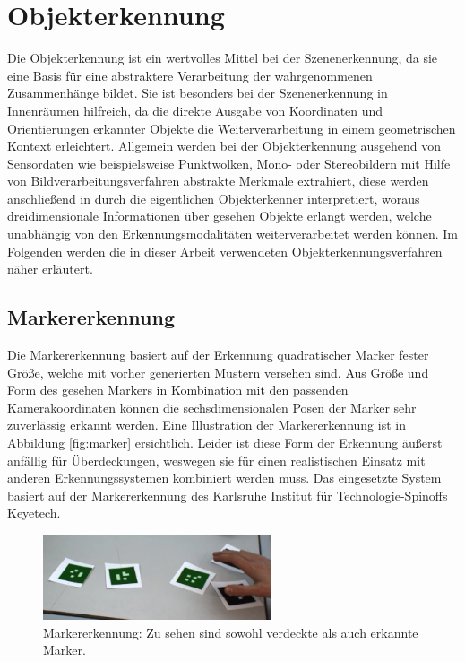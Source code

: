 \section{Objekterkennung}

Die Objekterkennung ist ein wertvolles Mittel bei der Szenenerkennung, da sie eine Basis für eine abstraktere Verarbeitung der wahrgenommenen Zusammenhänge bildet.
Sie ist besonders bei der Szenenerkennung in Innenräumen hilfreich, da die direkte Ausgabe von Koordinaten und Orientierungen erkannter Objekte die Weiterverarbeitung in einem geometrischen Kontext erleichtert.
Allgemein werden bei der Objekterkennung ausgehend von Sensordaten wie beispielsweise Punktwolken, Mono- oder Stereobildern mit Hilfe von Bildverarbeitungsverfahren abstrakte Merkmale extrahiert, diese werden anschließend in durch die eigentlichen Objekterkenner interpretiert, woraus dreidimensionale Informationen über gesehen Objekte erlangt werden, welche unabhängig von den Erkennungsmodalitäten weiterverarbeitet werden können.
Im Folgenden werden die in dieser Arbeit verwendeten Objekterkennungsverfahren näher erläutert.

\subsection{Markererkennung}

Die Markererkennung basiert auf der Erkennung quadratischer Marker fester Größe, welche mit vorher generierten Mustern versehen sind.
Aus Größe und Form des gesehen Markers in Kombination mit den passenden Kamerakoordinaten können die sechsdimensionalen Posen der Marker sehr zuverlässig erkannt werden.
Eine Illustration der Markererkennung ist in Abbildung \vref{fig:marker} ersichtlich.
Leider ist diese Form der Erkennung äußerst anfällig für Überdeckungen, weswegen sie für einen realistischen Einsatz mit anderen Erkennungssystemen kombiniert werden muss.
Das eingesetzte System basiert auf der Markererkennung des Karlsruhe Institut für Technologie-Spinoffs Keyetech.

\begin{figure}
  \centering
  \includegraphics[width=0.6\textwidth]{bilder/marker.jpg}
  \caption{Markererkennung: Zu sehen sind sowohl verdeckte als auch erkannte Marker.}
  \label{fig:marker}
\end{figure}

